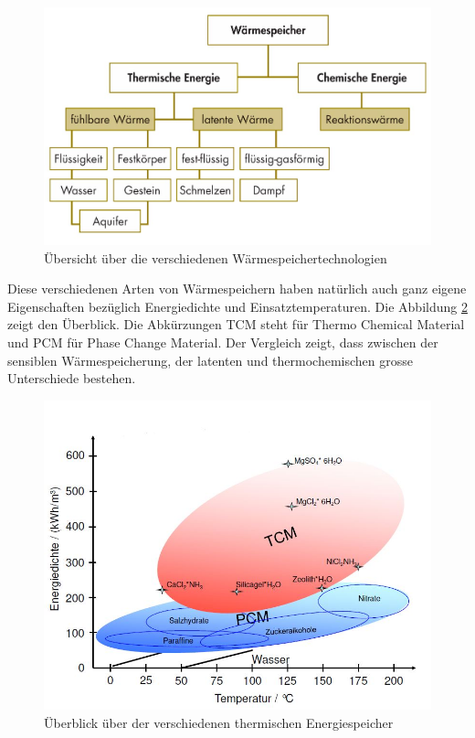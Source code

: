 \documentclass[11pt,a4paper]{scrartcl}
\begin{document}
\begin{figure}[h]
\begin{center}
\includegraphics[scale=0.3]{images/speicher.jpg}
\caption{Übersicht über die verschiedenen Wärmespeichertechnologien
\cite{BINE1}}
\label{fig:Wärmespeicher}
\end{center}
\end{figure}


Diese verschiedenen Arten von Wärmespeichern haben natürlich auch ganz eigene
Eigenschaften bezüglich Energiedichte und Einsatztemperaturen. Die Abbildung
\ref{fig:temperaturenergiedichte} zeigt den Überblick. Die Abkürzungen TCM steht
für Thermo Chemical Material und PCM für Phase Change Material. Der
Vergleich zeigt, dass zwischen der sensiblen Wärmespeicherung, der latenten
und thermochemischen grosse Unterschiede bestehen.

\begin{figure}[h]
\begin{center}
\includegraphics[scale=0.5]{images/temperaturenergiedichte.jpg}
\caption{Überblick über der verschiedenen thermischen Energiespeicher
\cite{zaebayern}}
\label{fig:temperaturenergiedichte}
\end{center}
\end{figure}
\end{document}
